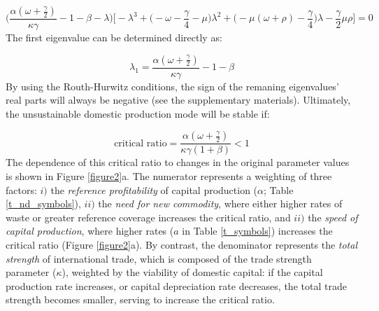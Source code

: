 \documentclass[12pt]{article}
\begin{document}
\begin{equation}
  \Big(\frac{\alpha(\omega + \frac{\gamma}{2})}{\kappa \gamma} - 1 - \beta - \lambda\Big) \Big[ - \lambda^3 + \big(-\omega - \frac{\gamma}{4} - \mu\big) \lambda^2 + \big(- \mu(\omega + \rho) - \frac{\gamma}{4}\big) \lambda - \frac{\gamma}{2} \mu \rho\Big] = 0
\end{equation}
%
The first eigenvalue can be determined directly as:

\begin{equation}
  \lambda_{1} = \frac{\alpha(\omega + \frac{\gamma}{2})}{\kappa \gamma} - 1 - \beta
\end{equation}
%
By using the Routh-Hurwitz conditions, the sign of the remaning eigenvalues' real parts \cite{ottoday2011} will always be negative (see the supplementary materials). Ultimately, the unsustainable domestic production mode will be stable if:

\begin{equation}
  \text{critical ratio} = \frac{ \alpha (\omega + \frac{\gamma}{2})}{\kappa \gamma(1+\beta)} < 1
\end{equation}
%
The dependence of this critical ratio to changes in the original parameter values is shown in Figure \ref{figure2}a. The numerator represents a weighting of three factors: $i)$ the \textit{reference profitability} of capital production ($\alpha$; Table \ref{t_nd_symbols}), $ii)$ the \textit{need for new commodity}, where either higher rates of waste or greater reference coverage increases the critical ratio, and $ii)$ the \textit{speed of capital production}, where higher rates ($a$ in Table \ref{t_symbols}) increases the critical ratio (Figure \ref{figure2}a). By contrast, the denominator represents the \textit{total strength} of international trade, which is composed of the trade strength parameter ($\kappa$), weighted by the viability of domestic capital: if the capital production rate increases, or capital depreciation rate decreases, the total trade strength becomes smaller, serving to increase the critical ratio.
\end{document}
